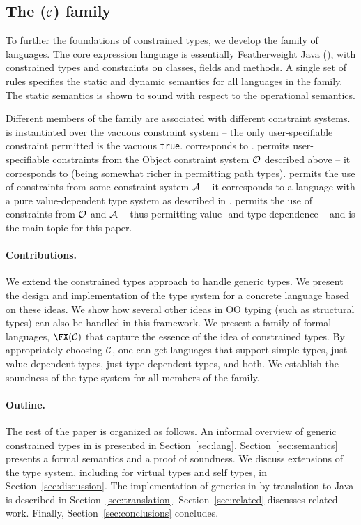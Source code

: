 \subsection{The \FX($\cal C$) family}
To further the foundations of constrained types, we develop the \FX{}
family of languages. The core expression language is essentially
Featherweight Java (\FJ \cite{FJ}), with constrained types and constraints on classes, fields
and methods. A single set of rules specifies the static and dynamic
semantics for all languages in the family.  The static semantics is
shown to sound with respect to the operational semantics.

Different members of the family are associated with different
constraint systems. \FXZ{} is
\FX{} instantiated over the vacuous constraint system -- the only
user-specifiable constraint permitted is the vacuous {\tt true}. \FXZ{}
corresponds to \FJ. \FXG{} permits user-specifiable constraints from the 
Object constraint system $\cal O$ described above -- it corresponds to
\FGJ{} (being somewhat richer in permitting path types). \FXD{} permits
the use of constraints from some constraint system $\cal A$ -- it
corresponds to a language with a pure value-dependent type system as
described in \cite{constrained-types}. \FXGD{} permits the use of constraints
from $\cal O$ and $\cal A$ -- thus permitting value- and
type-dependence -- and is the main topic for this paper.


\paragraph{Contributions.}
We extend the constrained types approach to handle generic types.  We
present the design and implementation of the type system for a
concrete language \Xten{} based on these ideas. We show how several
other ideas in OO typing (such as structural types) can also be
handled in this framework. We present a family of formal languages,
$\FX(\cal C)$ that capture the essence of the idea of constrained
types. By appropriately choosing $\cal C$, one can get languages that
support simple types, just value-dependent types, just type-dependent
types, and both. We establish the soundness of the type system for all
members of the family.

\paragraph{Outline.}

The rest of the paper is organized as follows.
%
An informal overview of generic constrained types in \Xten{}
is presented in
Section~\ref{sec:lang}.  
%
Section~\ref{sec:semantics} presents a formal semantics and a
proof of soundness.
%
We discuss extensions of the type system, including for
virtual types and self types, in
Section~\ref{sec:discussion}.
%
The implementation of generics in \Xten{} by translation to Java is described in 
Section~\ref{sec:translation}.
%
Section~\ref{sec:related} discusses related work.
%
Finally, Section~\ref{sec:conclusions} concludes.


